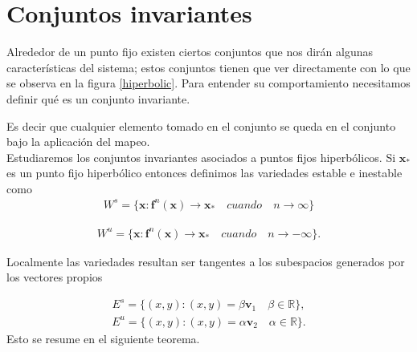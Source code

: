 \section{Conjuntos invariantes}
Alrededor de un punto fijo existen ciertos conjuntos que nos dirán algunas características del sistema; estos conjuntos tienen que ver directamente con lo que se observa en la figura \ref{hiperbolic}. Para entender su comportamiento necesitamos definir qué es un conjunto invariante.

Es decir que cualquier elemento tomado en el conjunto se queda en el conjunto bajo la aplicación del mapeo. \\
Estudiaremos los conjuntos invariantes asociados a puntos fijos hiperbólicos. Si $\mathbf{x}_{*}$ es un punto fijo hiperbólico entonces definimos las variedades estable e inestable como
\begin{eqnarray}
W^{s}=\lbrace \mathbf{x} : \mathbf{f}^{n}(\mathbf{x})\rightarrow \mathbf{x}_{*} \quad cuando \quad n\rightarrow \infty \rbrace
\label{variedad estable}
\end{eqnarray}

\begin{eqnarray}
W^{u}=\lbrace \mathbf{x} : \mathbf{f}^{n}(\mathbf{x})\rightarrow \mathbf{x}_{*} \quad cuando \quad n\rightarrow -\infty \rbrace.
\label{variedad inestable}
\end{eqnarray}


Localmente las variedades resultan ser tangentes a los subespacios generados por los vectores propios

\begin{eqnarray*}
E^{s}=\lbrace (x,y) : (x,y)=\beta \pmb v_{1} \quad \beta\in \mathbb{R}\rbrace,
\end{eqnarray*}
\begin{eqnarray*}
E^{u}=\lbrace (x,y) : (x,y)=\alpha \pmb v_{2}\quad \alpha\in \mathbb{R}\rbrace .
\end{eqnarray*}
Esto se resume en el siguiente teorema.


